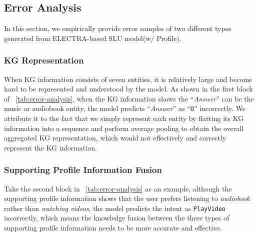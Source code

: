 \documentclass[letterpaper]{article} \usepackage{aaai22}  \usepackage{times}  \usepackage{helvet}  \usepackage{courier}  \usepackage[hyphens]{url}  \usepackage{graphicx} \urlstyle{rm} \def\UrlFont{\rm}  \usepackage{natbib}  \usepackage{caption} \DeclareCaptionStyle{ruled}{labelfont=normalfont,labelsep=colon,strut=off} \frenchspacing  \setlength{\pdfpagewidth}{8.5in}  \setlength{\pdfpageheight}{11in}  \usepackage{algorithm}
\begin{document}
\subsection{Error Analysis}
In this section, we empirically provide error samples of two different types generated from ELECTRA-based SLU model(w/ Profile).

\subsubsection{KG Representation}
When KG information consists of seven entities, it is relatively large and become hard to be represented and understood by the model. 
As shown in the first block of \tablename~\ref{tab:error-analysis}, when the KG information shows the ``\textit{Answer}'' can be the music or audiobook entity, the model predicts ``\textit{Answer}'' as ``\texttt{O}'' incorrectly.
We attribute it to the fact that we simply represent each entity by flatting its KG information into a sequence and perform average pooling to obtain the overall aggregated KG representation, which would not effectively and correctly represent the KG information.

\subsubsection{Supporting Profile Information Fusion}
Take the second block in \tablename~\ref{tab:error-analysis} as an example, although the supporting profile information shows that the user prefers listening to \textit{audiobook} rather than \textit{watching videos}, the model predicts the intent as \texttt{PlayVideo} incorrectly, which means the knowledge fusion between the three types of supporting profile information needs to be more accurate and effective.
\end{document}
